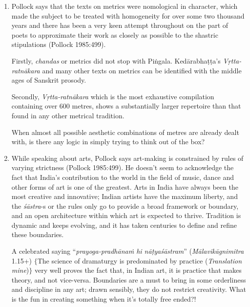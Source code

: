 \begin{enumerate}
\item Pollock says that the texts on metrics were nomological in character, which made the subject to be treated with homogeneity for over some two thousand years and there has been a very keen attempt throughout on the part of poets to approximate their work as closely as possible to the shastric stipulations (Pollock 1985:499). 

Firstly, {\it chandas} or metrics did not stop with Piṅgala. Kedārabhaṭṭa's \textsl{Vṛtta-ratnākara} and many other texts on metrics can be identified with the middle ages of Sanskrit prosody. 

Secondly, {\it Vṛtta-ratnākara} which is the most exhaustive compilation containing over 600 metres,  shows a substantially larger repertoire than that found in any other metrical tradition. 

When almost all possible aesthetic combinations of metres are already dealt with, is there any logic in simply trying to think out of the box?  

\item While speaking about arts, Pollock says art-making is constrained by rules of varying strictness (Pollock 1985:499). He doesn't seem to acknowledge the fact that India's contribution to the world in the field of music, dance and other forms of art is one of the greatest. Arts in India have always been the most creative and innovative; Indian artists have the maximum liberty, and the {\it śāstra}-s or the rules only go to provide a broad framework or boundary, and an open architecture within which art is expected to thrive. Tradition is dynamic and keeps evolving, and it has taken centuries to define and refine these boundaries. 

A celebrated saying ``\textsl{prayoga-pradhānaṁ hi nāṭyaśāstram}'' ({\it Māla\-vikāgnimitra} 1.15+) $\{$The science of dramaturgy is predominated by practice (\textsl{Translation mine})$\}$ very well proves the fact that, in Indian art, it is practice that makes theory, and not vice-versa. Boundaries are a must to bring in some orderliness and discipline in any art; drawn sensibly, they do not restrict creativity. What is the fun in creating something when it's totally free ended?! 


\end{enumerate}
